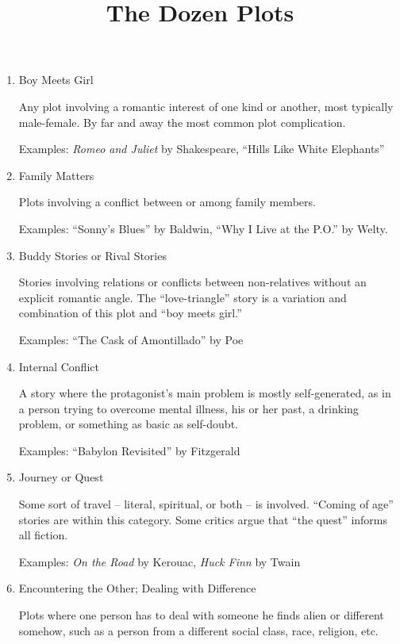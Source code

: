 \documentclass[12pt]{article}
\newcommand{\litem}[1]{\item{\large #1} \nopagebreak}
\newcommand{\eg}{Examples: }
\newcommand{\book}[1]{\textit{#1}}
\newcommand{\story}[1]{``#1''}
\begin{document}
\title{The Dozen Plots} 
\date{} 
\maketitle

\begin{enumerate}
\setlength{\itemsep}{3mm}
\setlength{\parsep}{2mm}

\litem{Boy Meets Girl}

Any plot involving a romantic interest of one kind or
another, most typically male-female. By far and away the
most common plot complication.

\eg \book{Romeo and Juliet} by Shakespeare, \story{Hills
Like White Elephants}



\litem{Family Matters}

Plots involving a conflict between or among family members.

\eg \story{Sonny's Blues} by Baldwin, \story{Why I Live at
the P.O.} by Welty.



\litem{Buddy Stories or Rival Stories}

Stories involving relations or conflicts
between non-relatives without an explicit romantic angle.
The ``love-triangle'' story is a variation and combination of
this plot and ``boy meets girl.''

\eg \story{The Cask of Amontillado} by Poe



\litem{Internal Conflict}

A story where the protagonist's main problem is mostly
self-generated, as in a person trying to overcome mental
illness, his or her past, a drinking problem, or something
as basic as self-doubt.

\eg \story{Babylon Revisited} by Fitzgerald



\litem{Journey or Quest}

Some sort of travel -- literal, spiritual, or both -- is
involved. ``Coming of age'' stories are within this category.
Some critics argue that ``the quest'' informs all fiction.

\eg \book{On the Road} by Kerouac, \book{Huck Finn} by Twain



\litem{Encountering the Other; Dealing with Difference}

Plots where one person has to deal with someone he finds
alien or different somehow, such as a person from a
different social class, race, religion, etc.


\end{enumerate}
\end{document}
